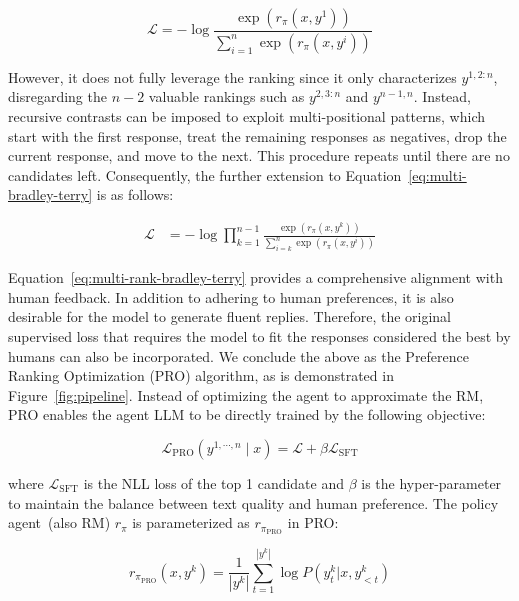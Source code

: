 \begin{equation}\label{eq:multi-bradley-terry}
    \mathcal{L} = -\log \frac{\exp\left(r_{\pi}(x, y^1)\right)}{\sum_{i=1}^{n}\exp\left(r_{\pi}(x, y^i)\right)}
\end{equation}

However, it does not fully leverage the ranking since it only characterizes $y^{1,2:n}$, disregarding the $n-2$ valuable rankings such as $y^{2,3:n}$ and $y^{n-1,n}$. Instead, recursive contrasts can be imposed to exploit multi-positional patterns, which start with the first response, treat the remaining responses as negatives, drop the current response, and move to the next. This procedure repeats until there are no candidates left. Consequently, the further extension to Equation~\ref{eq:multi-bradley-terry} is as follows:

\begin{equation}
\begin{aligned}
\label{eq:multi-rank-bradley-terry}
\mathcal{L}& = -\log \prod_{k=1}^{n-1} \frac{\exp\left( r_{\pi}(x, y^k)\right)}{\sum_{i=k}^{n}\exp\left( r_{\pi}(x, y^i)\right)}
\end{aligned}
\end{equation}

Equation~\ref{eq:multi-rank-bradley-terry} provides a comprehensive alignment with human feedback. In addition to adhering to human preferences, it is also desirable for the model to generate fluent replies. Therefore, the original supervised loss that requires the model to fit the responses considered the best by humans can also be incorporated. We conclude the above as the Preference Ranking Optimization (PRO) algorithm, as is demonstrated in Figure~\ref{fig:pipeline}. Instead of optimizing the agent to approximate the RM, PRO enables the agent LLM to be directly trained by the following objective:

\begin{equation}
\label{eq:pro}
    \mathcal{L}_{\text{PRO}}(y^{1, \cdots, n} \mid x) = \mathcal{L} + \beta\mathcal{L}_{\text{SFT}}
\end{equation}

where $\mathcal{L}_{\text{SFT}}$ is the NLL loss of the top 1 candidate and $\beta$ is the hyper-parameter to maintain the balance between text quality and human preference. The policy agent~(also RM) $r_{\pi}$ is parameterized as $r_{\pi_{\text{PRO}}}$ in PRO:

\begin{equation}
\label{eq:lm_csore}
r_{\pi_{\text{PRO}}}(x, y^k) = \frac{1}{\left| y^k \right|}\sum_{t=1}^{\left| y^k \right|} \log P(y_{t}^k|x,y^k_{<t})
\end{equation}

